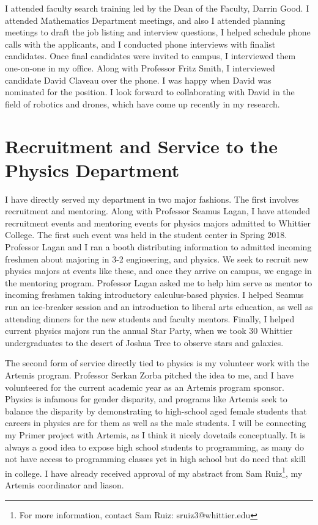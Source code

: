 \documentclass[../main.tex]{subfiles}
\begin{document}
I attended faculty search training led by the Dean of the Faculty, Darrin Good.  I attended Mathematics Department meetings, and also I attended planning meetings to draft the job listing and interview questions, I helped schedule phone calls with the applicants, and I conducted phone interviews with finalist candidates.  Once final candidates were invited to campus, I interviewed them one-on-one in my office.  Along with Professor Fritz Smith, I interviewed candidate David Claveau over the phone.  I was happy when David was nominated for the position.  I look forward to collaborating with David in the field of robotics and drones, which have come up recently in my research. \\ \hspace{0.1cm}

\section{Recruitment and Service to the Physics Department}

I have directly served my department in two major fashions.  The first involves recruitment and mentoring.  Along with Professor Seamus Lagan, I have attended recruitment events and mentoring events for physics majors admitted to Whittier College.  The first such event was held in the student center in Spring 2018.  Professor Lagan and I ran a booth distributing information to admitted incoming freshmen about majoring in 3-2 engineering, and physics.  We seek to recruit new physics majors at events like these, and once they arrive on campus, we engage in the mentoring program.  Professor Lagan asked me to help him serve as mentor to incoming freshmen taking introductory calculus-based physics.  I helped Seamus run an ice-breaker session and an introduction to liberal arts education, as well as attending dinners for the new students and faculty mentors.  Finally, I helped current physics majors run the annual Star Party, when we took 30 Whittier undergraduates to the desert of Joshua Tree to observe stars and galaxies.  \\ \hspace{0.1cm}

The second form of service directly tied to physics is my volunteer work with the Artemis program.  Professor Serkan Zorba pitched the idea to me, and I have volunteered for the current academic year as an Artemis program sponsor.  Physics is infamous for gender disparity, and programs like Artemis seek to balance the disparity by demonstrating to high-school aged female students that careers in physics are for them as well as the male students.  I will be connecting my Primer project with Artemis, as I think it nicely dovetails conceptually.  It is always a good idea to expose high school students to programming, as many do not have access to programming classes yet in high school but do need that skill in college.  I have already received approval of my abstract from Sam Ruiz\footnote{For more information, contact Sam Ruiz: sruiz3@whittier.edu}, my Artemis coordinator and liason. \\ \hspace{0.1cm}
\end{document}
